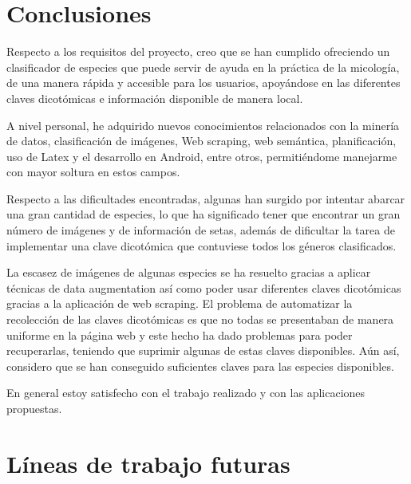 


\section{Conclusiones}

Respecto a los requisitos del proyecto, creo que se han cumplido ofreciendo un clasificador de especies que puede servir de ayuda en la práctica de la micología, de una manera rápida y accesible para los usuarios, apoyándose en las diferentes claves dicotómicas e información disponible de manera local.

A nivel personal, he adquirido nuevos conocimientos relacionados con la minería de datos, clasificación de imágenes, Web scraping, web semántica, planificación, uso de Latex y  el desarrollo en Android, entre otros, permitiéndome manejarme con mayor soltura en estos campos.

Respecto a las dificultades encontradas, algunas han surgido por intentar abarcar una gran cantidad de especies, lo que ha significado tener que encontrar un gran número de imágenes y de información de setas, además de dificultar la tarea de implementar una clave dicotómica que contuviese todos los géneros clasificados.

La escasez de imágenes de algunas especies se ha resuelto gracias a aplicar técnicas de data augmentation así como poder usar diferentes claves dicotómicas gracias a la aplicación de web scraping. El problema de automatizar la recolección de las claves dicotómicas es que no todas se presentaban de manera uniforme en la página web y este hecho ha dado problemas para poder recuperarlas, teniendo que suprimir algunas de estas claves disponibles. Aún así, considero que se han conseguido suficientes claves para las especies disponibles.

En general estoy satisfecho con el trabajo realizado y con las aplicaciones propuestas.

\section{Líneas de trabajo futuras}

